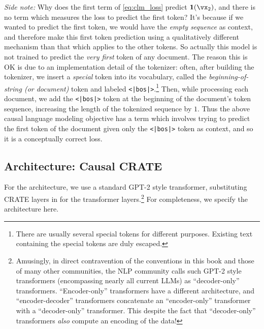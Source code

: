 \documentclass[\toplevelprefix/book-main.tex]{subfiles}
\begin{document}
\textit{Side note:} Why does the first term of \eqref{eq:clm_loss} predict \(\vone(\vx_{2})\), and there is no term which measures the loss to predict the first token? It's because if we wanted to predict the first token, we would have the \textit{empty sequence} as context, and therefore make this first token prediction using a qualitatively different mechanism than that which applies to the other tokens. So actually this model is not trained to predict the \textit{very first} token of any document. The reason this is OK is due to an implementation detail of the tokenizer: often, after building the tokenizer, we insert a \textit{special} token into its vocabulary, called the \textit{beginning-of-string (or document)} token and labeled \texttt{<|bos|>}.\footnote{There are usually several special tokens for different purposes. Existing text containing the special tokens are duly escaped.} Then, while processing each document, we add the \texttt{<|bos|>} token at the beginning of the document's token sequence, increasing the length of the tokenized sequence by \(1\). Thus the above causal language modeling objective has a term which involves trying to predict the first token of the document given only the \texttt{<|bos|>} token as context, and so it is a conceptually correct loss.

\subsection{Architecture: Causal CRATE}

For the architecture, we use a standard GPT-2 style transformer, substituting CRATE layers in for the transformer layers.\footnote{Amusingly, in direct contravention of the conventions in this book and those of many other communities, the NLP community calls such GPT-2 style transformers (encompassing nearly all current LLMs) as ``decoder-only'' transformers. ``Encoder-only'' transformers have a different architecture, and ``encoder-decoder'' transformers concatenate an ``encoder-only'' transformer with a ``decoder-only'' transformer. This despite the fact that ``decoder-only'' transformers \textit{also} compute an encoding of the data!} For completeness, we specify the architecture here.
\end{document}
